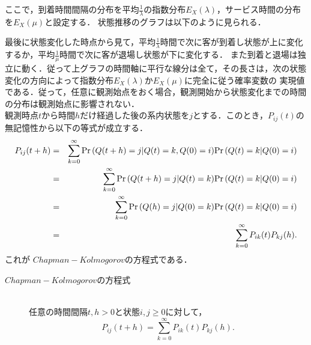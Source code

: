 \documentclass[a4j,papersize,disablejfam,slide,14pt]{jsarticle}
\def\cprob#1#2{\mbox{${\rm Pr} \left( #1 | #2 \right)$}} %
\begin{document}
	ここで，到着時間間隔の分布を平均$\frac{1}{\lambda}$の指数分布$E_X(\lambda)$，サービス時間の分布を$E_X(\mu)$と設定する．
    状態推移のグラフは以下のように見られる．
    \begin{picture}
    	
    \end{picture}
    最後に状態変化した時点から見て，平均$\frac{1}{\lambda}$時間で次に客が到着し状態が上に変化するか，平均$\frac{1}{\mu}$時間で次に客が退場し状態が下に変化する．
    また到着と退場は独立に動く．従って上グラフの時間軸に平行な線分は全て，その長さは，次の状態変化の方向によって指数分布$E_X(\lambda)$か$E_X(\mu)$に完全に従う確率変数の
    実現値である．従って，任意に観測始点をおく場合，観測開始から状態変化までの時間の分布は観測始点に影響されない．\\
    観測時点$t$から時間$h$だけ経過した後の系内状態を$j$とする．このとき，$P_{ij}(t)$の無記憶性から以下の等式が成立する．
    \begin{eqnarray}
    	P_{ij}(t+h) &=& \sum_{k=0}^{\infty} \cprob{Q(t+h) = j}{Q(t) = k, Q(0) = i}\cprob{Q(t) = k}{Q(0) = i} \\
        &=& \sum_{k=0}^{\infty} \cprob{Q(t+h) = j}{Q(t) = k}\cprob{Q(t) = k}{Q(0) = i} \\
        &=& \sum_{k=0}^{\infty} \cprob{Q(h) = j}{Q(0) = k}\cprob{Q(t) = k}{Q(0) = i} \\
        &=& \sum_{k=0}^{\infty} P_{ik}(t)P_{kj}(h).
    \end{eqnarray}
    これが $Chapman-Kolmogorov$の方程式である．
    \begin{screen}
    	\begin{description}
        	\item[$Chapman-Kolmogorov$の方程式]\mbox{}\\
            	任意の時間間隔$t,h > 0$と状態$i,j \geq 0$に対して，
                \[
            		P_{ij}(t+h) = \sum_{k=0}^{\infty} P_{ik}(t)P_{kj}(h).
                \]
        \end{description}
    \end{screen}
\end{document}
